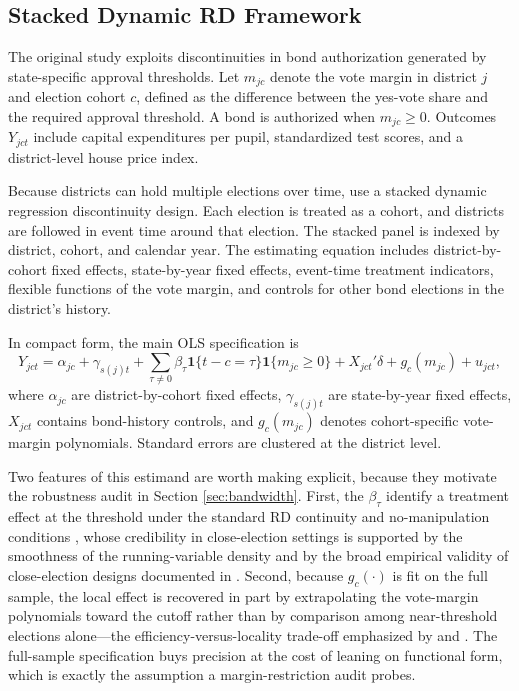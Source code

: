 \subsection{Stacked Dynamic RD Framework}

The original study exploits discontinuities in bond authorization generated by state-specific approval thresholds. Let $m_{jc}$ denote the vote margin in district $j$ and election cohort $c$, defined as the difference between the yes-vote share and the required approval threshold. A bond is authorized when $m_{jc} \geq 0$. Outcomes $Y_{jct}$ include capital expenditures per pupil, standardized test scores, and a district-level house price index.

Because districts can hold multiple elections over time, \citet{biasi_what_2025} use a stacked dynamic regression discontinuity design. Each election is treated as a cohort, and districts are followed in event time around that election. The stacked panel is indexed by district, cohort, and calendar year. The estimating equation includes district-by-cohort fixed effects, state-by-year fixed effects, event-time treatment indicators, flexible functions of the vote margin, and controls for other bond elections in the district's history.

In compact form, the main OLS specification is
\[
Y_{jct}
= \alpha_{jc} + \gamma_{s(j)t}
+ \sum_{\tau \neq 0} \beta_{\tau}
\mathbf{1}\{t-c=\tau\}\mathbf{1}\{m_{jc}\geq 0\}
+ X_{jct}'\delta + g_c(m_{jc}) + u_{jct},
\]
where $\alpha_{jc}$ are district-by-cohort fixed effects, $\gamma_{s(j)t}$ are state-by-year fixed effects, $X_{jct}$ contains bond-history controls, and $g_c(m_{jc})$ denotes cohort-specific vote-margin polynomials. Standard errors are clustered at the district level.

Two features of this estimand are worth making explicit, because they motivate the robustness audit in Section \ref{sec:bandwidth}. First, the $\beta_\tau$ identify a treatment effect at the threshold under the standard RD continuity and no-manipulation conditions \citep{lee2008randomized,lee_lemieux2010}, whose credibility in close-election settings is supported by the smoothness of the running-variable density \citep{mccrary2008manipulation,cattaneo2020simple} and by the broad empirical validity of close-election designs documented in \citet{eggers2015validity}. Second, because $g_c(\cdot)$ is fit on the full sample, the local effect is recovered in part by extrapolating the vote-margin polynomials toward the cutoff rather than by comparison among near-threshold elections alone---the efficiency-versus-locality trade-off emphasized by \citet{calonico2014robust} and \citet{imbens2012optimal}. The full-sample specification buys precision at the cost of leaning on functional form, which is exactly the assumption a margin-restriction audit probes.

